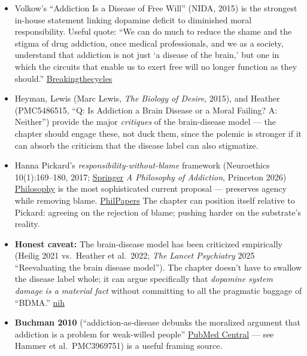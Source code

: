 \begin{itemize}
\tightlist
\item
  Volkow's ``Addiction Is a Disease of Free Will'' (NIDA, 2015) is the strongest in-house statement linking dopamine deficit to diminished moral responsibility. Useful quote: ``We can do much to reduce the shame and the stigma of drug addiction, once medical professionals, and we as a society, understand that addiction is not just `a disease of the brain,' but one in which the circuits that enable us to exert free will no longer function as they should.'' \href{https://www.breakingthecycles.com/2015/06/21/disease-of-addiction-disease-of-free-will-dr-nora-volkow/}{Breakingthecycles}
\item
  Heyman, Lewis (Marc Lewis, \emph{The Biology of Desire}, 2015), and Heather (PMC5486515, ``Q: Is Addiction a Brain Disease or a Moral Failing? A: Neither'') provide the major \emph{critiques} of the brain-disease model --- the chapter should engage these, not duck them, since the polemic is stronger if it can absorb the criticism that the disease label can also stigmatize.
\item
  Hanna Pickard's \emph{responsibility-without-blame} framework (Neuroethics 10(1):169--180, 2017; \href{https://link.springer.com/article/10.1007/s12152-016-9295-2}{Springer} \emph{A Philosophy of Addiction}, Princeton 2026) \href{https://philosophy.jhu.edu/directory/hanna-pickard/}{Philosophy} is the most sophisticated current proposal --- preserves agency while removing blame. \href{https://philpapers.org/rec/PICRWB-4}{PhilPapers} The chapter can position itself relative to Pickard: agreeing on the rejection of blame; pushing harder on the substrate's reality.
\item
  \textbf{Honest caveat:} The brain-disease model has been criticized empirically (Heilig 2021 vs.~Heather et al.~2022; \emph{The Lancet Psychiatry} 2025 ``Reevaluating the brain disease model''). The chapter doesn't have to swallow the disease label whole; it can argue specifically that \emph{dopamine system damage is a material fact} without committing to all the pragmatic baggage of ``BDMA.'' \href{https://www.ncbi.nlm.nih.gov/pmc/articles/PMC5486515/}{nih}
\item
  \textbf{Buchman 2010} (``addiction-as-disease debunks the moralized argument that addiction is a problem for weak-willed people'' \href{https://pmc.ncbi.nlm.nih.gov/articles/PMC3969751/}{PubMed Central} --- see Hammer et al.~PMC3969751) is a useful framing source.
\end{itemize}

